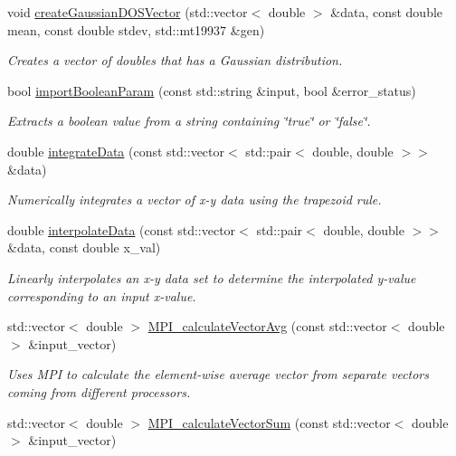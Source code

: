 \begin{DoxyCompactItemize}
void \hyperlink{namespace_utils_a2ce45ade7d6d4f2995b595da3ebbaaec}{create\+Gaussian\+D\+O\+S\+Vector} (std\+::vector$<$ double $>$ \&data, const double mean, const double stdev, std\+::mt19937 \&gen)
\begin{DoxyCompactList}\small\item\em Creates a vector of doubles that has a Gaussian distribution. \end{DoxyCompactList}\item 
bool \hyperlink{namespace_utils_a98a0cc670327fc21e272a07cbf5025ec}{import\+Boolean\+Param} (const std\+::string \&input, bool \&error\+\_\+status)
\begin{DoxyCompactList}\small\item\em Extracts a boolean value from a string containing \char`\"{}true\char`\"{} or \char`\"{}false\char`\"{}. \end{DoxyCompactList}\item 
double \hyperlink{namespace_utils_a49411c9d4c7a065dbcf237aa27a84023}{integrate\+Data} (const std\+::vector$<$ std\+::pair$<$ double, double $>$$>$ \&data)
\begin{DoxyCompactList}\small\item\em Numerically integrates a vector of x-\/y data using the trapezoid rule. \end{DoxyCompactList}\item 
double \hyperlink{namespace_utils_af68995497777ee14d812c65991a4046f}{interpolate\+Data} (const std\+::vector$<$ std\+::pair$<$ double, double $>$$>$ \&data, const double x\+\_\+val)
\begin{DoxyCompactList}\small\item\em Linearly interpolates an x-\/y data set to determine the interpolated y-\/value corresponding to an input x-\/value. \end{DoxyCompactList}\item 
std\+::vector$<$ double $>$ \hyperlink{namespace_utils_a71eeb04d74f890da3d27128c37fcff78}{M\+P\+I\+\_\+calculate\+Vector\+Avg} (const std\+::vector$<$ double $>$ \&input\+\_\+vector)
\begin{DoxyCompactList}\small\item\em Uses M\+PI to calculate the element-\/wise average vector from separate vectors coming from different processors. \end{DoxyCompactList}\item 
std\+::vector$<$ double $>$ \hyperlink{namespace_utils_a0a17d0ad939418dc745bcfd194ce2bc1}{M\+P\+I\+\_\+calculate\+Vector\+Sum} (const std\+::vector$<$ double $>$ \&input\+\_\+vector)

\end{DoxyCompactItemize}
